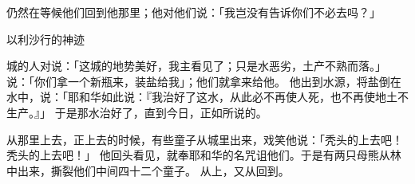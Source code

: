 {仍然在{}等候他们回到他那里；他对他们说：「我岂没有告诉你们不必去吗？」
\par }{\SH 以利沙行的神迹
\par }{\PP {}城的人对{}说：「这城的地势美好，我主看见了；只是水恶劣，土产不熟而落。」
说：「你们拿一个新瓶来，装盐给我」；他们就拿来给他。
他出到水源，将盐倒在水中，说：「耶和华如此说：『我治好了这水，从此必不再使人死，也不再使地土不生产。』」
于是那水治好了，直到今日，正如{}所说的。
\par }{\PP {}从那里上{}去，正上去的时候，有些童子从城里出来，戏笑他说：「秃头的上去吧！秃头的上去吧！」
他回头看见，就奉耶和华的名咒诅他们。于是有两只母熊从林中出来，撕裂他们中间四十二个童子。
从{}上{}，又从{}回到{}。

}
